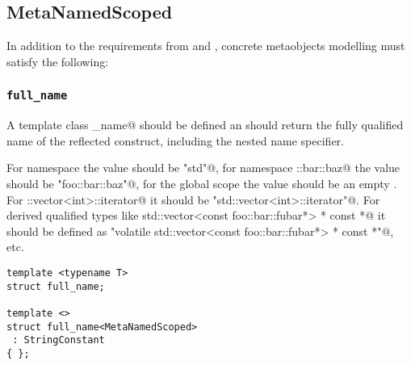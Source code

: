 \subsection{MetaNamedScoped}
\label{concept-MetaNamedScoped}


In addition to the requirements from  and ,
concrete metaobjects modelling  must satisfy the following:

\subsubsection{\texttt{full\_name}}

A template class \verb@full_name@ should be defined an should return the fully
qualified name of the reflected construct, including the nested name specifier.

For namespace \verb@std@ the value 
should be \verb@"std"@, for namespace \verb@foo::bar::baz@ the value should
be \verb@"foo::bar::baz"@, for the global scope the value should be an empty
.
For \verb@std::vector<int>::iterator@ it should be \verb@"std::vector<int>::iterator"@.
For derived qualified types like
\verb@volatile std::vector<const foo::bar::fubar*> * const *@ it should be defined as
\verb@"volatile std::vector<const foo::bar::fubar*> * const *"@, etc.

\begin{verbatim}
template <typename T>
struct full_name;

template <>
struct full_name<MetaNamedScoped>
 : StringConstant
{ };
\end{verbatim}

